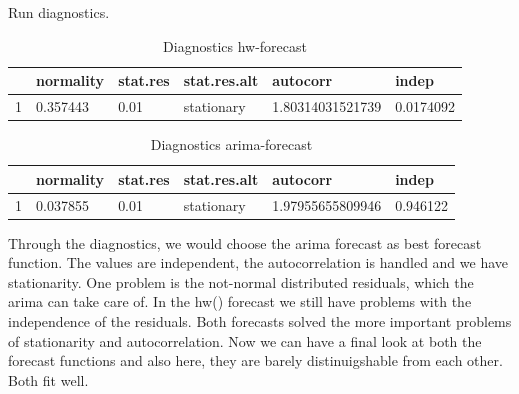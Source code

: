 \documentclass[10pt, a4paper]{article} %
\begin{document}
Run diagnostics.\\
\begin{table}[ht]
\centering
\begin{tabular}{rlllll}
  \hline
 & normality & stat.res & stat.res.alt & autocorr & indep \\ 
  \hline
1 & 0.357443 & 0.01 & stationary & 1.80314031521739 & 0.0174092 \\ 
   \hline
\end{tabular}
\caption{ Diagnostics hw-forecast} 
\end{table}%
\begin{table}[ht]
\centering
\begin{tabular}{rlllll}
  \hline
 & normality & stat.res & stat.res.alt & autocorr & indep \\ 
  \hline
1 & 0.037855 & 0.01 & stationary & 1.97955655809946 & 0.946122 \\ 
   \hline
\end{tabular}
\caption{Diagnostics arima-forecast} 
\end{table}\linebreak

\noindent Through the diagnostics, we would choose the arima forecast as best forecast function. The values are independent, the autocorrelation is handled and we have stationarity. One problem is the not-normal distributed residuals, which the arima can take care of. In the hw() forecast we still have problems with the independence of the residuals. Both forecasts solved the more important problems of stationarity and autocorrelation. Now we can have a final look at both the forecast functions and also here, they are barely distinuigshable from each other. Both fit well.
\end{document}
